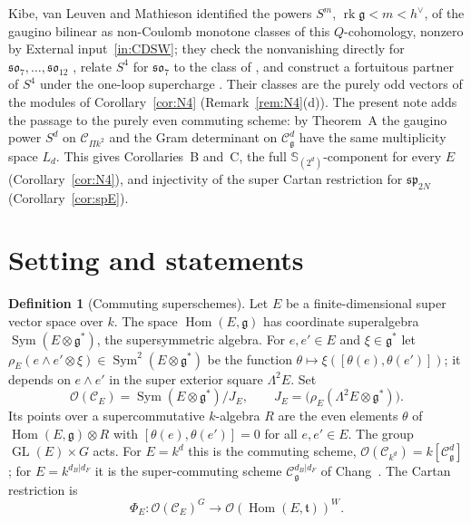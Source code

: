 \documentclass[11pt]{article}
\theoremstyle{definition}
\newtheorem{definition}[theorem]{Definition}
\newcommand{\g}{\mathfrak g}
\newcommand{\h}{\mathfrak t}
\newcommand{\Cs}{\mathcal C}
\newcommand{\Oo}{\mathcal O}
\newcommand{\rk}{\operatorname{rk}}
\newcommand{\Sf}{\mathbb S}
\newcommand{\hv}{h^\vee}
\DeclareMathOperator{\Sym}{Sym}
\DeclareMathOperator{\Hom}{Hom}
\DeclareMathOperator{\GL}{GL}
\begin{document}
Kibe, van Leuven and Mathieson \cite[eq.~(1)]{KvLM26} identified the powers $S^m$, $\rk\g<m<\hv$, of the gaugino bilinear as non-Coulomb monotone classes of this $Q$-cohomology, nonzero by External input~\ref{in:CDSW}; they check the nonvanishing directly for $\mathfrak{so}_7,\dots,\mathfrak{so}_{12}$ \cite[\S4.5]{KvLM26}, relate $S^4$ for $\mathfrak{so}_7$ to the class of \cite{CL25,CE25}, and construct a fortuitous partner of $S^4$ under the one-loop supercharge \cite[\S5]{KvLM26}. Their classes are the purely odd vectors of the modules of Corollary~\ref{cor:N4} (Remark~\ref{rem:N4}(d)). The present note adds the passage to the purely even commuting scheme: by Theorem~A the gaugino power $S^d$ on $\Cs_{\Pi k^2}$ and the Gram determinant on $\Cs^d_\g$ have the same multiplicity space $L_d$. This gives Corollaries~B and~C, the full $\Sf_{(2^d)}$-component for every $E$ (Corollary~\ref{cor:N4}), and injectivity of the super Cartan restriction for $\mathfrak{sp}_{2N}$ (Corollary~\ref{cor:spE}).

\section{Setting and statements}\label{sec:setting}

\begin{definition}[Commuting superschemes]\label{def:CE}
Let $E$ be a finite-dimensional super vector space over $k$. The space $\Hom(E,\g)$ has coordinate superalgebra $\Sym(E\otimes\g^*)$, the supersymmetric algebra. For $e,e'\in E$ and $\xi\in\g^*$ let $\rho_E(e\wedge e'\otimes\xi)\in\Sym^2(E\otimes\g^*)$ be the function $\theta\mapsto\xi([\theta(e),\theta(e')])$; it depends on $e\wedge e'$ in the super exterior square $\Lambda^2E$. Set
\[
\Oo(\Cs_E)=\Sym(E\otimes\g^*)\big/J_E,\qquad J_E=\bigl(\rho_E(\Lambda^2E\otimes\g^*)\bigr).
\]
Its points over a supercommutative $k$-algebra $R$ are the even elements $\theta$ of $\Hom(E,\g)\otimes R$ with $[\theta(e),\theta(e')]=0$ for all $e,e'\in E$. The group $\GL(E)\times G$ acts. For $E=k^d$ this is the commuting scheme, $\Oo(\Cs_{k^d})=k[\Cs^d_\g]$ \cite[\S3]{CN20}; for $E=k^{d_B|d_F}$ it is the super-commuting scheme $\Cs^{d_B|d_F}_\g$ of Chang~\cite[\S2]{Ch26}. The Cartan restriction is
\[
\Phi_E:\Oo(\Cs_E)^G\longrightarrow\Oo(\Hom(E,\h))^W .
\]
\end{definition}
\end{document}
